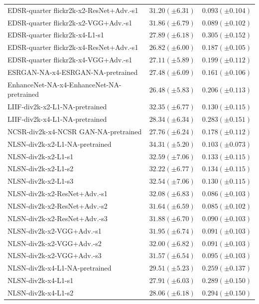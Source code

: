 \documentclass[10pt]{article} %
\begin{document}
\begin{longtable}{| p{} | p{} | p{} |}
EDSR-quarter flickr2k-x2-ResNet+Adv.-s1 & $31.20 (\pm 6.31)$ & $0.093 (\pm 0.104)$ \\
EDSR-quarter flickr2k-x2-VGG+Adv.-s1 & $31.86 (\pm 6.79)$ & $0.089 (\pm 0.102)$ \\
EDSR-quarter flickr2k-x4-L1-s1 & $27.89 (\pm 6.18)$ & $0.305 (\pm 0.152)$ \\
EDSR-quarter flickr2k-x4-ResNet+Adv.-s1 & $26.82 (\pm 6.00)$ & $0.187 (\pm 0.105)$ \\
EDSR-quarter flickr2k-x4-VGG+Adv.-s1 & $27.11 (\pm 5.89)$ & $0.199 (\pm 0.112)$ \\
ESRGAN-NA-x4-ESRGAN-NA-pretrained & $27.48 (\pm 6.09)$ & $0.161 (\pm 0.106)$ \\
EnhanceNet-NA-x4-EnhanceNet-NA-pretrained & $26.48 (\pm 5.83)$ & $0.206 (\pm 0.113)$ \\
LIIF-div2k-x2-L1-NA-pretrained & $32.35 (\pm 6.77)$ & $0.130 (\pm 0.115)$ \\
LIIF-div2k-x4-L1-NA-pretrained & $28.34 (\pm 6.34)$ & $0.283 (\pm 0.151)$ \\
NCSR-div2k-x4-NCSR GAN-NA-pretrained & $27.76 (\pm 6.24)$ & $0.178 (\pm 0.112)$ \\
NLSN-div2k-x2-L1-NA-pretrained & $34.31 (\pm 5.20)$ & $0.103 (\pm 0.073)$ \\
NLSN-div2k-x2-L1-s1 & $32.59 (\pm 7.06)$ & $0.133 (\pm 0.115)$ \\
NLSN-div2k-x2-L1-s2 & $32.22 (\pm 6.77)$ & $0.134 (\pm 0.115)$ \\
NLSN-div2k-x2-L1-s3 & $32.54 (\pm 7.06)$ & $0.130 (\pm 0.115)$ \\
NLSN-div2k-x2-ResNet+Adv.-s1 & $32.08 (\pm 6.83)$ & $0.086 (\pm 0.103)$ \\
NLSN-div2k-x2-ResNet+Adv.-s2 & $31.64 (\pm 6.59)$ & $0.085 (\pm 0.102)$ \\
NLSN-div2k-x2-ResNet+Adv.-s3 & $31.88 (\pm 6.70)$ & $0.090 (\pm 0.103)$ \\
NLSN-div2k-x2-VGG+Adv.-s1 & $31.95 (\pm 6.74)$ & $0.091 (\pm 0.103)$ \\
NLSN-div2k-x2-VGG+Adv.-s2 & $32.00 (\pm 6.82)$ & $0.091 (\pm 0.103)$ \\
NLSN-div2k-x2-VGG+Adv.-s3 & $31.57 (\pm 6.54)$ & $0.095 (\pm 0.103)$ \\
NLSN-div2k-x4-L1-NA-pretrained & $29.51 (\pm 5.23)$ & $0.259 (\pm 0.137)$ \\
NLSN-div2k-x4-L1-s1 & $27.91 (\pm 6.03)$ & $0.289 (\pm 0.150)$ \\
NLSN-div2k-x4-L1-s2 & $28.06 (\pm 6.18)$ & $0.294 (\pm 0.150)$ \\

\end{longtable}
\end{document}

